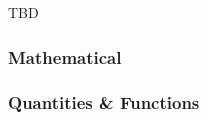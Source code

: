 \documentclass[thesis.tex]{subfiles}
\begin{document}
TBD

\subsubsection*{Mathematical}



\subsubsection*{Quantities \& Functions}

\end{document}
